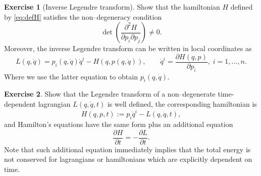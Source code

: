 \documentclass[english,fontsize=11pt,paper=b5]{scrbook}
\theoremstyle{definition}
\newtheorem{exercise}{Exercise}[chapter]
\begin{document}
    \begin{exercise}[Inverse Legendre transform]
      Show that the hamiltonian $H$ defined by \eqref{eq:defH} satisfies the non--degeneracy condition
      \begin{equation}
        \det\left(\frac{\partial^2 H}{\partial p_i\partial p_j}\right) \neq 0.
      \end{equation}
      Moreover, the inverse Legendre transform can be written in local coordinates as
      \begin{equation}\label{eq:inverseLegendre}
        L(q, \dot q) = p_i(q, \dot q) \dot q^i - H(q, p(q,\dot q)),\qquad
        \dot q^i = \frac{\partial H (q,p)}{\partial p_i}, \; i=1,\ldots,n.
      \end{equation}
      Where we use the latter equation to obtain $p_i(q, \dot q)$.
    \end{exercise}

    \begin{exercise}\label{exe:timedep}
      Show that the Legendre transform of a non--degenerate time-dependent lagrangian $L(q,\dot q, t)$ is well defined, the corresponding hamiltonian is
      \begin{equation}
        H(q,p,t) := p_i \dot q^i - L(q, \dot q, t),
      \end{equation}
      and Hamilton's equations have the same form plus an additional equation
      \begin{equation}
        \frac{\partial H}{\partial t} = - \frac{\partial L}{\partial t}.
      \end{equation}
      Note that such additional equation immediately implies that the total energy is not conserved for lagrangians or hamiltonians which are explicitly dependent on time.
    \end{exercise}
\end{document}
